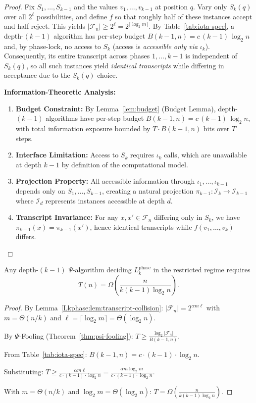\begin{proof}
Fix $S_1,\ldots,S_{k-1}$ and the values $v_1,\ldots,v_{k-1}$ at position $q$. Vary only $S_k(q)$ over all $2^{\ell}$ possibilities, and define $f$ so that roughly half of these instances accept and half reject. This yields $\lvert\mathcal{F}_n\rvert\ge 2^{\ell}=2^{\lceil\log_{2} m\rceil}$. By Table~\ref{tab:iota-spec}, a depth-$(k{-}1)$ algorithm has per-step budget $B(k{-}1,n)=c\,(k{-}1)\,\log_{2} n$ and, by phase-lock, no access to $S_k$ (access is \emph{accessible only via} $\iota_k$). Consequently, its entire transcript across phases $1,\ldots,k{-}1$ is independent of $S_k(q)$, so all such instances yield \emph{identical transcripts} while differing in acceptance due to the $S_k(q)$ choice.

\textbf{Information-Theoretic Analysis:}
\begin{enumerate}
\item \textbf{Budget Constraint:} By Lemma~\ref{lem:budget} (Budget Lemma), depth-$(k{-}1)$ algorithms have per-step budget $B(k{-}1,n) = c\,(k{-}1)\,\log_{2} n$, with total information exposure bounded by $T \cdot B(k{-}1,n)$ bits over $T$ steps.
\item \textbf{Interface Limitation:} Access to $S_k$ requires $\iota_k$ calls, which are unavailable at depth $k{-}1$ by definition of the computational model.
\item \textbf{Projection Property:} All accessible information through $\iota_1,\ldots,\iota_{k-1}$ depends only on $S_1,\ldots,S_{k-1}$, creating a natural projection $\pi_{k-1}:\mathcal{I}_k\to\mathcal{I}_{k-1}$ where $\mathcal{I}_d$ represents instances accessible at depth $d$.
\item \textbf{Transcript Invariance:} For any $x,x'\in\mathcal{F}_n$ differing only in $S_k$, we have $\pi_{k-1}(x)=\pi_{k-1}(x')$, hence identical transcripts while $f(v_1,\ldots,v_k)$ differs.
\end{enumerate}
\end{proof}

\begin{theorem}[LB at depth $k{-}1$]
\label{Lkphase:thm:LB}
Any depth-$(k{-}1)$ $\Psi$-algorithm deciding $L_k^{\text{phase}}$ in the restricted regime requires
\[
T(n)=\Omega\!\left(\frac{n}{k(k{-}1)\log_{2} n}\right).
\]
\end{theorem}

\begin{proof}
By Lemma~\ref{Lkphase:lem:transcript-collision}: $|\mathcal{F}_n| = 2^{\alpha m \ell}$ with $m = \Theta(n/k)$ and $\ell = \lceil\log_{2} m\rceil = \Theta(\log_{2} n)$.

By \(\Psi\)-Fooling (Theorem~\ref{thm:psi-fooling}): $T \geq \frac{\log_{2}|\mathcal{F}_n|}{B(k-1,n)}$.

From Table~\ref{tab:iota-spec}: $B(k-1,n) = c \cdot (k-1) \cdot \log_{2} n$.

Substituting: $T \geq \frac{\alpha m \ell}{c \cdot (k-1) \cdot \log_{2} n} = \frac{\alpha m \log_{2} m}{c \cdot (k-1) \cdot \log_{2} n}$.

With $m = \Theta(n/k)$ and $\log_{2} m = \Theta(\log_{2} n)$: $T = \Omega\left(\frac{n}{k(k-1)\log_{2} n}\right)$.
\end{proof}

